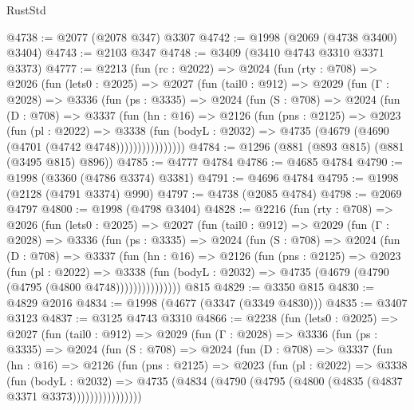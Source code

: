 \begin{lexlean}{RustStd}
\begin{coremodule}
@4738 := @2077 (@2078 @347) @3307
@4742 := @1998 (@2069 (@4738 @3400) @3404)
@4743 := @2103 @347
@4748 := @3409 (@3410 @4743 @3310 @3371 @3373)
@4777 := @2213
    (fun (rc : @2022) =>
    @2024
      (fun (rty : @708) =>
      @2026
        (fun (lets0 : @2025) =>
        @2027
          (fun (tail0 : @912) =>
          @2029
            (fun (Γ : @2028) =>
            @3336
              (fun (ps : @3335) =>
              @2024
                (fun (S : @708) =>
                @2024
                  (fun (D : @708) =>
                  @3337
                    (fun (hn : @16) =>
                    @2126
                      (fun (pns : @2125) =>
                      @2023
                        (fun (pl : @2022) =>
                        @3338
                          (fun (bodyL : @2032) =>
                          @4735 (@4679 (@4690 (@4701 (@4742 @4748))))))))))))))))
@4784 := @1296 (@881 (@893 @815) (@881 (@3495 @815) @896))
@4785 := @4777 @4784
@4786 := @4685 @4784
@4790 := @1998 (@3360 (@4786 @3374) @3381)
@4791 := @4696 @4784
@4795 := @1998 (@2128 (@4791 @3374) @990)
@4797 := @4738 (@2085 @4784)
@4798 := @2069 @4797
@4800 := @1998 (@4798 @3404)
@4828 := @2216
    (fun (rty : @708) =>
    @2026
      (fun (lets0 : @2025) =>
      @2027
        (fun (tail0 : @912) =>
        @2029
          (fun (Γ : @2028) =>
          @3336
            (fun (ps : @3335) =>
            @2024
              (fun (S : @708) =>
              @2024
                (fun (D : @708) =>
                @3337
                  (fun (hn : @16) =>
                  @2126
                    (fun (pns : @2125) =>
                    @2023
                      (fun (pl : @2022) =>
                      @3338
                        (fun (bodyL : @2032) =>
                        @4735 (@4679 (@4790 (@4795 (@4800 @4748)))))))))))))))
    @815
@4829 := @3350 @815
@4830 := @4829 @2016
@4834 := @1998 (@4677 (@3347 (@3349 @4830)))
@4835 := @3407 @3123
@4837 := @3125 @4743 @3310
@4866 := @2238
    (fun (lets0 : @2025) =>
    @2027
      (fun (tail0 : @912) =>
      @2029
        (fun (Γ : @2028) =>
        @3336
          (fun (ps : @3335) =>
          @2024
            (fun (S : @708) =>
            @2024
              (fun (D : @708) =>
              @3337
                (fun (hn : @16) =>
                @2126
                  (fun (pns : @2125) =>
                  @2023
                    (fun (pl : @2022) =>
                    @3338
                      (fun (bodyL : @2032) =>
                      @4735 (@4834 (@4790 (@4795 (@4800 (@4835 (@4837 @3371 @3373))))))))))))))))

\end{coremodule}
\end{lexlean}
